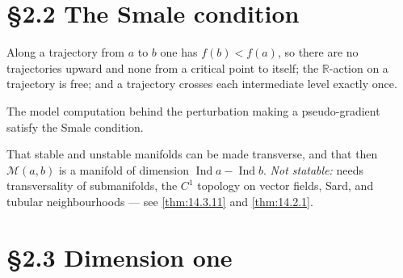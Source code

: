 \section{\S2.2 The Smale condition}

\begin{proposition}
  \label{prop:2.2}
  \leanok
  Along a trajectory from $a$ to $b$ one has $f(b) < f(a)$, so there are no
  trajectories upward and none from a critical point to itself; the
  $\mathbb{R}$-action on a trajectory is free; and a trajectory crosses each
  intermediate level exactly once.
\end{proposition}

\begin{lemma}[Lemma 2.2.9]
  \label{lem:2.2.9}
  \leanok
  The model computation behind the perturbation making a pseudo-gradient
  satisfy the Smale condition.
\end{lemma}

\begin{theorem}
  \label{thm:2.2.5}
  \notready
  That stable and unstable manifolds can be made transverse, and that then
  $\mathcal{M}(a,b)$ is a manifold of dimension
  $\operatorname{Ind} a - \operatorname{Ind} b$.
  \emph{Not statable:} needs transversality of submanifolds, the $C^1$ topology
  on vector fields, Sard, and tubular neighbourhoods --- see \ref{thm:14.3.11}
  and \ref{thm:14.2.1}.
\end{theorem}

\section{\S2.3 Dimension one}

